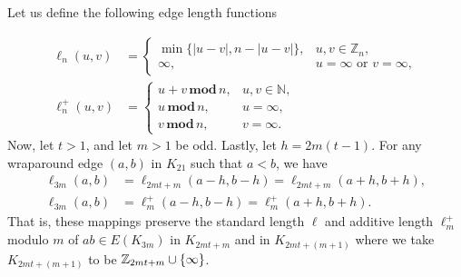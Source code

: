 \begin{thm}\label{thm:genwrapmap}
Let us define the following edge length functions

\begin{align*}
    \ell_{n}(u,v)&=
      \begin{cases}
        \min\{|u-v|,n-|u-v|\}, & u,v\in \mathbb{Z}_{n},\\
        \infty, & u=\infty\text{ or }v=\infty,
      \end{cases}\\
    \ell_{n}^{+}(u,v)&=
      \begin{cases}
        u+v\mathbf{\,mod\,}n, & u,v\in \mathbb{N},\\
        u\mathbf{\,mod\,}n,   & u=\infty,\\
        v\mathbf{\,mod\,}n,   & v=\infty.
      \end{cases}
    \end{align*}
\noindent Now, let $t>1$, and let $m>1$ be odd. Lastly, let $h =2m(t-1)$. For any wraparound edge $(a,b)$ in $K_{21}$ such that $a<b$, we have
\begin{align}
  \ell_{3m}(a,b)
    &=\ell_{2mt+m}(a-h,b-h)
     =\ell_{2mt+m}(a+h,b+h),
  \tag{short}\label{eq:short}\\
  \ell_{3m}(a,b)
    &=\ell_{m}^{+}(a-h,b-h)
     =\ell_{m}^{+}(a+h,b+h).
  \tag{wraparound}\label{eq:wraparound}
\end{align}
That is, these mappings preserve the standard length $\ell$ and additive length $\ell_{m}^{+}$ modulo $m$ of $ab\in E(K_{3m})$ in $K_{2mt+m}$ and in $K_{2mt+(m+1)}$ where we take $K_{2mt+(m+1)}$ to be $\mathbb{Z}_{2mt+m}\cup \{\infty\}$.
\end{thm}


